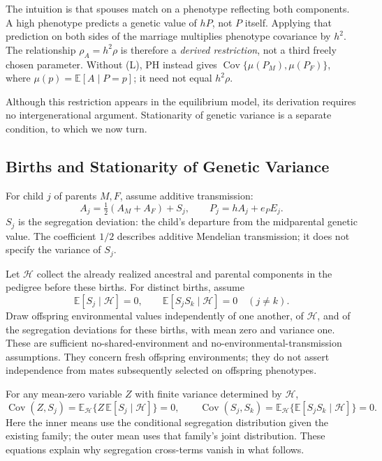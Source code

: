 The intuition is that spouses match on a phenotype reflecting both
components. A high phenotype predicts a genetic value of $hP$, not
$P$ itself. Applying that prediction on both sides of the marriage
multiplies phenotype covariance by $h^2$. The relationship
$\rho_A=h^2\rho$ is therefore a \emph{derived restriction}, not a third
freely chosen parameter. Without (L), PH instead gives
$\operatorname{Cov}\{\mu(P_M),\mu(P_F)\}$, where
$\mu(p)=\mathbb E[A\mid P=p]$; it need not equal $h^2\rho$.

Although this restriction appears in the equilibrium model, its
derivation requires no intergenerational argument. Stationarity of
genetic variance is a separate condition, to which we now turn.

\subsection{Births and Stationarity of Genetic Variance}
\label{sec:model-transmission}

For child $j$ of parents $M,F$, assume additive transmission:
\begin{equation}
 A_j=\tfrac12(A_M+A_F)+S_j,\qquad P_j=hA_j+e_P E_j.
 \label{eq:model-transmission}
\end{equation}
$S_j$ is the segregation deviation: the child's departure from the
midparental genetic value. The coefficient $1/2$ describes additive
Mendelian transmission; it does not specify the variance of $S_j$.

Let $\mathcal H$ collect the already realized ancestral and parental
components in the pedigree before these births. For distinct births,
assume
\[
 \mathbb E[S_j\mid\mathcal H]=0,\qquad
 \mathbb E[S_jS_k\mid\mathcal H]=0\quad(j\ne k).
\]
Draw offspring environmental values independently of one another,
of $\mathcal H$, and of the segregation deviations for these births,
with mean zero and variance one. These are sufficient
no-shared-environment and no-environmental-transmission assumptions.
They concern fresh offspring environments; they do not assert
independence from mates subsequently selected on offspring phenotypes.

For any mean-zero variable $Z$ with finite variance determined by $\mathcal H$,
\[
 \operatorname{Cov}(Z,S_j)
 =\mathbb E_{\mathcal H}\{Z\,\mathbb E[S_j\mid\mathcal H]\}=0,\qquad
 \operatorname{Cov}(S_j,S_k)
 =\mathbb E_{\mathcal H}\{\mathbb E[S_jS_k\mid\mathcal H]\}=0.
\]
Here the inner means use the conditional segregation distribution given
the existing family; the outer mean uses that family's joint
distribution. These equations explain why segregation cross-terms
vanish in what follows.

